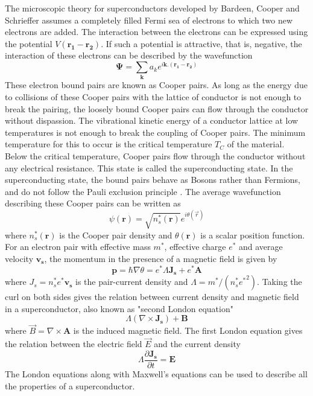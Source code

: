 \documentclass[letterpaper,english,reprint, aps]{revtex4-1}
\begin{document}
The microscopic theory for superconductors developed by Bardeen, Cooper and Schrieffer assumes a completely filled Fermi sea of electrons to which two new electrons are added. The interaction between the electrons can be expressed using the potential $V(\boldsymbol{r_1} - \boldsymbol{r_2})$. If such a potential is attractive, that is, negative, the interaction of these electrons can be described by the wavefunction
\begin{equation}
    \mathbf{\Psi} = \sum_{\boldsymbol{k}} a_k e^{i\boldsymbol{k}.(\boldsymbol{r_1} - \boldsymbol{r_2})}
\end{equation}
These electron bound pairs are known as Cooper pairs. As long as the energy due to collisions of these Cooper pairs with the lattice of conductor is not enough to break the pairing, the loosely bound Cooper pairs can flow through the conductor without dispassion. The vibrational kinetic energy of a conductor lattice at low temperatures is not enough to break the coupling of Cooper pairs. The minimum temperature for this to occur is the critical temperature $T_C$ of the material. Below the critical temperature, Cooper pairs flow through the conductor without any electrical resistance. This state is called the superconducting state. In the superconducting state, the bound pairs behave as Bosons rather than Fermions, and do not follow the Pauli exclusion principle \citep{vanduzer,fermi_gas,feynman}. The average wavefunction describing these Cooper pairs can be written as 
\begin{equation}
    \psi(\boldsymbol{r}) = \sqrt{n_s^*(\boldsymbol{r})}e^{i\theta(\Vec{r})}
\end{equation}
where $n_s^*(\boldsymbol{r})$ is the Cooper pair density and $\theta(\boldsymbol{r})$ is a scalar position function. For an electron pair with effective mass $m^*$, effective charge $e^*$ and average velocity $\boldsymbol{v_s}$, the momentum in the presence of a magnetic field is given by
\begin{equation}
    \boldsymbol{p} = \hbar \nabla \theta = e^*\Lambda \boldsymbol{J_s} + e^*\boldsymbol{A} 
\end{equation}
where $J_s = n_s^* e^* \boldsymbol{v_s}$ is the pair-current density and $\Lambda = m^*/(n_s^* {e^*}^2)$. Taking the curl on both sides gives the relation between current density and magnetic field in a superconductor, also known as "second London equation" \citep{london_paper}
\begin{equation}
    \Lambda(\nabla \times \boldsymbol{J_s} ) + \boldsymbol{B} \label{eq:second_london}
\end{equation}
where $\Vec{B} = \nabla \times \boldsymbol{A}$ is the induced magnetic field. The first London equation gives the relation between the electric field $\Vec{E}$ and the current density 
\begin{equation}
    \Lambda \frac{\partial\boldsymbol{J_s}}{\partial t} = \boldsymbol{E}
\end{equation}
The London equations along with Maxwell's equations can be used to describe all the properties of a superconductor. 
\end{document}

